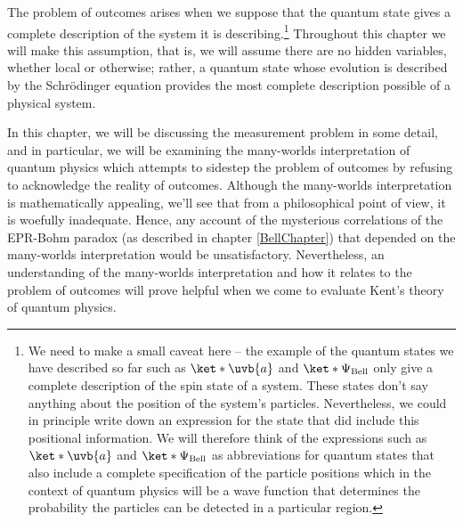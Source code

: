 \documentclass[12pt]{report}
\begin{document}
The problem of outcomes arises when we suppose that the quantum state gives a complete description of the system it is describing.\footnote{We need to make a small caveat here -- the example of the quantum states we have described so far such as $\ket*{\uvb{a}}$ and $\ket*{\Psi_{\text{Bell}}}$ only give a complete description of the spin state of a system. These states don't say anything about the position of the system's particles. Nevertheless, we could in principle write down an expression for the state that did include this positional information. We will therefore think of the expressions such as $\ket*{\uvb{a}}$ and $\ket*{\Psi_{\text{Bell}}}$ as abbreviations for quantum states that also include a complete specification of the particle positions which in the context of quantum physics will be a wave function that determines the probability the particles can be detected in a particular region.} Throughout this chapter we will make this assumption, that is, we will assume there are no hidden variables, whether local or otherwise; rather, a quantum state whose evolution is described by the Schr\"{o}dinger equation provides the most complete description possible of a physical system.

In this chapter, we will be discussing the measurement problem in some detail, and in particular, we will be examining the many-worlds interpretation of quantum physics which attempts to sidestep the problem of outcomes by refusing to acknowledge the reality of outcomes. Although the many-worlds interpretation is mathematically appealing, we'll see that from a philosophical point of view, it is woefully inadequate. Hence, any account of the mysterious correlations of the EPR-Bohm paradox (as described in chapter \ref{BellChapter}) that depended on the many-worlds interpretation would be unsatisfactory. Nevertheless, an understanding of the many-worlds interpretation and how it relates to the problem of outcomes will prove helpful when we come to evaluate Kent's theory of quantum physics. 

\end{document}
